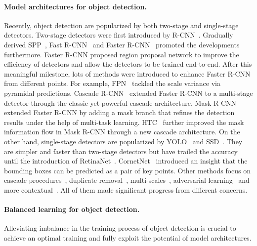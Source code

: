 \documentclass[10pt,twocolumn,letterpaper]{article}
\begin{document}
\paragraph{Model architectures for object detection.}
Recently, object detection are popularized by both two-stage and single-stage detectors.
Two-stage detectors were first introduced by R-CNN~\cite{rcnn}.
Gradually derived SPP~\cite{spp}, Fast R-CNN~\cite{fastrcnn} and Faster R-CNN~\cite{frcnn} promoted the developments furthermore.
Faster R-CNN proposed region proposal network to improve the efficiency of detectors and allow the detectors to be trained end-to-end.
After this meaningful milestone, lots of methods were introduced to enhance Faster R-CNN from different points.
For example,
FPN~\cite{fpn} tackled the scale variance via pyramidal predictions.
Cascade R-CNN~\cite{cascadercnn} extended Faster R-CNN to a multi-stage detector through the classic yet powerful cascade architecture.
Mask R-CNN~\cite{maskrcnn} extended Faster R-CNN by adding a mask branch that refines the detection results under the help of multi-task learning.
HTC~\cite{htc} further improved the mask information flow in Mask R-CNN through a new cascade architecture.
On the other hand, single-stage detectors are popularized by YOLO~\cite{yolo, yolo9000} and SSD~\cite{ssd}.
They are simpler and faster than two-stage detectors but have trailed the accuracy until the introduction of RetinaNet~\cite{focalloss}.
CornetNet~\cite{cornernet} introduced an insight that the bounding boxes can be predicted as a pair of key points.
Other methods focus on
	cascade procedures~\cite{ouyang2017chained},
	duplicate removal~\cite{relationnetwork, learningnms},
	multi-scales~\cite{cai2016unified, bell2016inside, sniper2018, snip},
	adversarial learning~\cite{adapt}
and more contextual~\cite{zeng2018crafting}.
All of them made significant progress from different concerns.

\vspace{-12pt}
\paragraph{Balanced learning for object detection.}
Alleviating imbalance in the training process of object detection is crucial to achieve an optimal training and fully exploit the potential of model architectures.

\vspace{-14pt}
\end{document}
